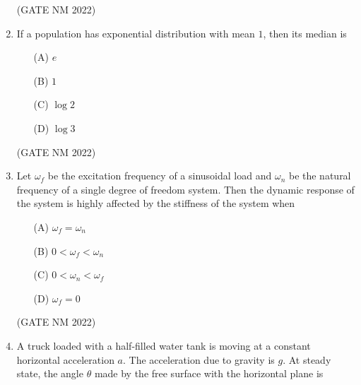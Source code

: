 \documentclass[journal,12pt,onecolumn]{IEEEtran}
\theoremstyle{remark}
\begin{document}
\begin{enumerate}
\hfill(GATE NM 2022)






\item  If a population has exponential distribution with mean $1$, then its median is

	\begin{multicols}{4}

\begin{enumerate}
    \item[(A)] $e$
    \item[(B)] $1$
    \item[(C)] $\log 2$
    \item[(D)] $\log 3$
\end{enumerate}

	\end{multicols}

\hfill(GATE NM 2022)




\item  Let $\omega_f$ be the excitation frequency of a sinusoidal load and $\omega_n$ be the natural frequency of a single degree of freedom system. Then the dynamic response of the system is highly affected by the stiffness of the system when

	\begin{multicols}{2}

\begin{enumerate}
    \item[(A)] $\omega_f = \omega_n$
    \item[(B)] $0 < \omega_f < \omega_n$
    \item[(C)] $0 < \omega_n < \omega_f$
    \item[(D)] $\omega_f = 0$
\end{enumerate}

	\end{multicols}

\hfill(GATE NM 2022)








\item  A truck loaded with a half-filled water tank is moving at a constant horizontal acceleration $a$. The acceleration due to gravity is $g$. At steady state, the angle $\theta$ made by the free surface with the horizontal plane is

	\begin{multicols}{4}


\end{multicols}
\end{enumerate}
\end{document}
